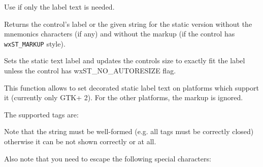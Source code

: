 Use  if only the
label text is needed.


\label{wxstatictextgetlabeltext}


Returns the control's label or the given  string for the static
version without the mnemonics characters (if any) and without the markup
(if the control has \texttt{wxST\_MARKUP} style).



\label{wxstatictextsetlabel}


Sets the static text label and updates the controls size to exactly fit the
label unless the control has wxST\_NO\_AUTORESIZE flag.

This function allows to set decorated static label text on platforms which
support it (currently only GTK+ 2). For the other platforms, the markup is
ignored.

The supported tags are:

\twocolwidtha{5cm}
\begin{twocollist}\itemsep=0pt
\end{twocollist}

Note that the string must be well-formed (e.g. all tags must be correctly closed)
otherwise it can be not shown correctly or at all.

Also note that you need to escape the following special characters:

\twocolwidtha{5cm}
\begin{twocollist}\itemsep=0pt
\end{twocollist}


